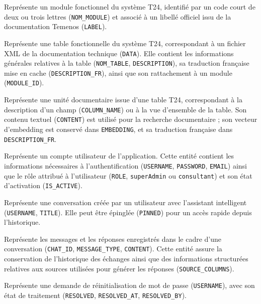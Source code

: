 ﻿\documentclass[12pt,a4paper]{report}
\newcommand{\code}[1]{\texttt{\color{biatbluedk}#1}}
\begin{document}
\begin{description}[leftmargin=3.2cm, style=nextline]
  \item[\code{MODULE\_T24}] Représente un module fonctionnel du système T24, identifié par un code court de deux ou trois lettres (\code{NOM\_MODULE}) et associé à un libellé officiel issu de la documentation Temenos (\code{LABEL}).

  \item[\code{TABLE\_T24}] Représente une table fonctionnelle du système T24, correspondant à un fichier XML de la documentation technique (\code{DATA}). Elle contient les informations générales relatives à la table (\code{NOM\_TABLE}, \code{DESCRIPTION}), sa traduction française mise en cache (\code{DESCRIPTION\_FR}), ainsi que son rattachement à un module (\code{MODULE\_ID}).

  \item[\code{DOCUMENT}] Représente une unité documentaire issue d'une table T24, correspondant à la description d'un champ (\code{COLUMN\_NAME}) ou à la vue d'ensemble de la table. Son contenu textuel (\code{CONTENT}) est utilisé pour la recherche documentaire ; son vecteur d'embedding est conservé dans \code{EMBEDDING}, et sa traduction française dans \code{DESCRIPTION\_FR}.

  \item[\code{APP\_USER}] Représente un compte utilisateur de l'application. Cette entité contient les informations nécessaires à l'authentification (\code{USERNAME}, \code{PASSWORD}, \code{EMAIL}) ainsi que le rôle attribué à l'utilisateur (\code{ROLE}, \code{superAdmin} ou \code{consultant}) et son état d'activation (\code{IS\_ACTIVE}).

  \item[\code{CHAT}] Représente une conversation créée par un utilisateur avec l'assistant intelligent (\code{USERNAME}, \code{TITLE}). Elle peut être épinglée (\code{PINNED}) pour un accès rapide depuis l'historique.

  \item[\code{CHAT\_HISTORY}] Représente les messages et les réponses enregistrés dans le cadre d'une conversation (\code{CHAT\_ID}, \code{MESSAGE\_TYPE}, \code{CONTENT}). Cette entité assure la conservation de l'historique des échanges ainsi que des informations structurées relatives aux sources utilisées pour générer les réponses (\code{SOURCE\_COLUMNS}).

  \item[\code{PASSWORD\_RESET\_REQUEST}] Représente une demande de réinitialisation de mot de passe (\code{USERNAME}), avec son état de traitement (\code{RESOLVED}, \code{RESOLVED\_AT}, \code{RESOLVED\_BY}).
\end{description}
\end{document}
